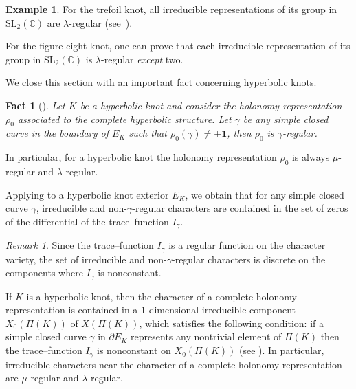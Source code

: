 \documentclass[a4paper]{amsart}
\theoremstyle{plain}
\newtheorem{fact}[theorem]{Fact}
\theoremstyle{definition}
\newtheorem{example}{Example}%
\theoremstyle{remark}
\newtheorem{remark}{Remark}%
\newcommand{\C}{{\mathbb C}}
\newcommand{\I}{\mathbf{1}}
\newcommand{\SL}{{\mathrm{SL}_2(\C)}}
\begin{document}
\begin{example}\label{ExReg}
For the trefoil knot, all irreducible representations of its group in $\SL$ are $\lambda$-regular (see~\cite{JDFourier}).

For the figure eight knot, one can prove that each irreducible representation of its group in $\SL$ is $\lambda$-regular \emph{except} two.
\end{example}

We close this section with an important fact concerning hyperbolic knots.
\begin{fact}[\cite{Porti:1997}]\label{holonomy}
Let $K$ be a hyperbolic knot and 
consider the holonomy representation $\rho_0$ associated to the complete hyperbolic structure. 
Let $\gamma$ be any simple closed curve in the boundary of $E_K$ such that $\rho_0(\gamma) \ne \pm \I$, then $\rho_0$ is $\gamma$-regular.
\end{fact}

In particular, for a hyperbolic knot the holonomy representation $\rho_0$ is always $\mu$-regular and $\lambda$-regular.

Applying  \cite[Proposition 3.26]{Porti:1997} to a hyperbolic knot exterior $E_K$,  
we obtain that for any simple closed curve $\gamma$, irreducible and non-$\gamma$-regular characters are contained in the set of zeros of the differential of the trace--function $I_{\gamma}$. 

\begin{remark}
Since the trace--function $I_{\gamma}$ is a regular function 
on the character variety,
the set of irreducible and non-$\gamma$-regular characters is discrete 
on the components where $I_{\gamma}$ is nonconstant.
\end{remark}

If $K$ is a hyperbolic knot, then the character of a complete holonomy representation is contained in a $1$-dimensional irreducible component $X_0(\Pi(K))$ of $X(\Pi(K))$, which satisfies the following condition: if a simple closed curve $\gamma$ in $\partial E_K$ represents any nontrivial element of $\Pi(K)$ then the trace--function $I_{\gamma}$ is nonconstant on $X_0(\Pi(K))$ (see \cite[Corollary 4.5.2]{HandBookGT}).
In particular, irreducible characters near the character of a complete holonomy representation
are $\mu$-regular and $\lambda$-regular.
\end{document}
